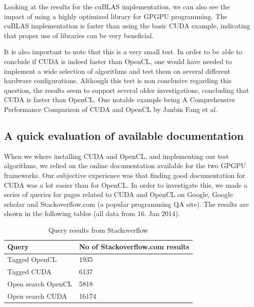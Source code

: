Looking at the results for the cuBLAS implementation, we can also see the impact of using a highly optimized library for GPGPU programming. The cuBLAS implementation is faster than using the basic CUDA example, indicating that proper use of libraries can be very beneficial.

It is also important to note that this is a very small test. In order to be able to conclude if CUDA is indeed faster than OpenCL, one would have needed to implement a wide selection of algorithms and test them on several different hardware configurations. Although this test is non conclusive regarding this question, the results seem to support several older investigations, concluding that CUDA is faster than OpenCL\@. One notable example being A Comprehensive Performance Comparison of
CUDA and OpenCL\cite{Fang11} by Janbin Fang et al.

\subsection{A quick evaluation of available documentation} %
\label{sub:a_quick_evaluation_of_available_documentation}

When we where installing CUDA and OpenCL, and implementing our test algorithms, we relied on the online documentation available for the two GPGPU frameworks. Our subjective experience was that finding good documentation for CUDA was a lot easier than for OpenCL\@. In order to investigate this, we made a series of queries for pages related to CUDA and OpenCL on Google, Google scholar and Stackoverflow.com (a popular programming QA site). The results are shown in the following tables (all data from 16. Jan 2014).

\begin{table}[ht]
\centering
    \begin{tabular}{ | l | l |}
    \hline
    \textbf{Query}     & \textbf{No of Stackoverflow.com results}    \\ \hline
    Tagged OpenCL      & 1935                                        \\ \hline
    Tagged CUDA        & 6137                                        \\ \hline
    Open search OpenCL & 5818                                        \\ \hline
    Open search CUDA   & 16174                                       \\ \hline
    \end{tabular}
    \caption{Query results from Stackoverflow}
    \label{fig:stackoverflow-terms-results}
\end{table}


